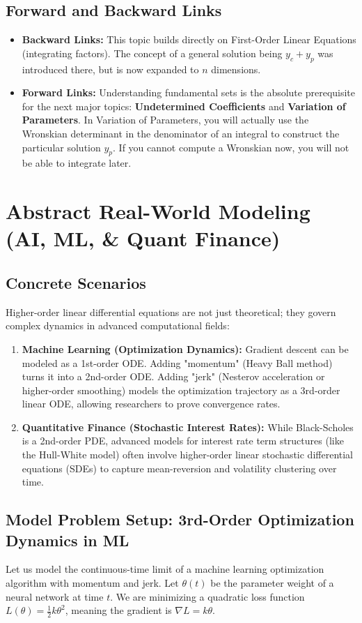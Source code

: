 \documentclass[11pt, a4paper]{article}
\theoremstyle{definition}
\theoremstyle{remark}
\begin{document}
\subsection{Forward and Backward Links}
\begin{itemize}
    \item \textbf{Backward Links:} This topic builds directly on First-Order Linear Equations (integrating factors). The concept of a general solution being $y_c + y_p$ was introduced there, but is now expanded to $n$ dimensions.
    \item \textbf{Forward Links:} Understanding fundamental sets is the absolute prerequisite for the next major topics: \textbf{Undetermined Coefficients} and \textbf{Variation of Parameters}. In Variation of Parameters, you will actually use the Wronskian determinant in the denominator of an integral to construct the particular solution $y_p$. If you cannot compute a Wronskian now, you will not be able to integrate later.
\end{itemize}

\section{Abstract Real-World Modeling (AI, ML, \& Quant Finance)}

\subsection{Concrete Scenarios}
Higher-order linear differential equations are not just theoretical; they govern complex dynamics in advanced computational fields:
\begin{enumerate}
    \item \textbf{Machine Learning (Optimization Dynamics):} Gradient descent can be modeled as a 1st-order ODE. Adding "momentum" (Heavy Ball method) turns it into a 2nd-order ODE. Adding "jerk" (Nesterov acceleration or higher-order smoothing) models the optimization trajectory as a 3rd-order linear ODE, allowing researchers to prove convergence rates.
    \item \textbf{Quantitative Finance (Stochastic Interest Rates):} While Black-Scholes is a 2nd-order PDE, advanced models for interest rate term structures (like the Hull-White model) often involve higher-order linear stochastic differential equations (SDEs) to capture mean-reversion and volatility clustering over time.
\end{enumerate}

\subsection{Model Problem Setup: 3rd-Order Optimization Dynamics in ML}
Let us model the continuous-time limit of a machine learning optimization algorithm with momentum and jerk. Let $\theta(t)$ be the parameter weight of a neural network at time $t$. We are minimizing a quadratic loss function $L(\theta) = \frac{1}{2} k \theta^2$, meaning the gradient is $\nabla L = k\theta$.
\end{document}
